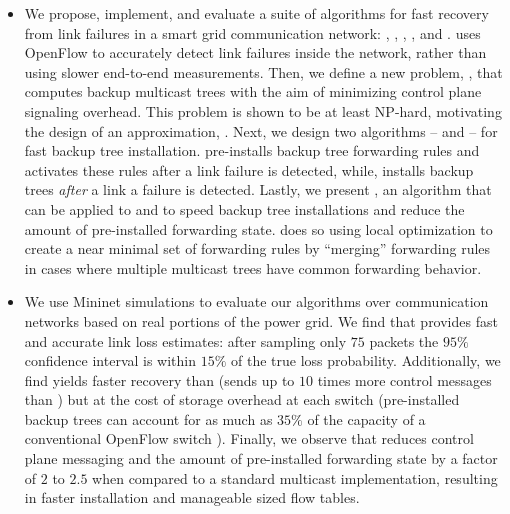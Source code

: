 \begin{itemize}
	\item We propose, implement, and evaluate a suite of algorithms for fast recovery from link failures in a smart grid communication network: \pcnts, \steiners, \pres, \posts, and \merges.
	\pcnt uses OpenFlow to accurately detect link failures inside the network, rather than using slower end-to-end measurements. Then, we define a new problem, \mcs, that computes backup 
	multicast trees with the aim of minimizing control plane signaling overhead. %
	This problem is shown to be at least NP-hard, motivating the design of an approximation, \steiners. 
	Next, we design two algorithms -- \pre and \post -- for fast backup tree installation. \pre pre-installs backup tree forwarding rules and
	activates these rules after a link failure is detected, while, \post installs backup trees \emph{after} a link a failure is detected. 
	Lastly, we present \merges, an algorithm that can be applied to \pre and \post to speed backup tree installations and reduce the amount of pre-installed forwarding state. 
	\merge does so using local optimization to create a near minimal set of forwarding rules by ``merging'' forwarding rules in cases where multiple multicast trees have common forwarding behavior.

	\item 
	We use Mininet \cite{Lantz10} simulations to evaluate our algorithms over communication networks based on real portions of the power grid.
	We find that \pcnt provides fast and accurate link loss estimates: after sampling only $75$ packets
	the $95\%$ confidence interval is within $15\%$ of the true loss probability.  
	Additionally, we find \pre yields faster recovery than \post (\post sends up to $10$ times more control messages than \pres) 
	but at the cost of storage overhead at each switch (pre-installed backup trees can account for as much
	as $35\%$ of the capacity of a conventional OpenFlow switch \cite{Curtis11}).
	Finally, we observe that \merge reduces control plane messaging and the amount of pre-installed forwarding state by a factor of $2$ to $2.5$ when compared to a standard multicast
	implementation, resulting in faster installation and manageable sized flow tables.






		

\end{itemize}




